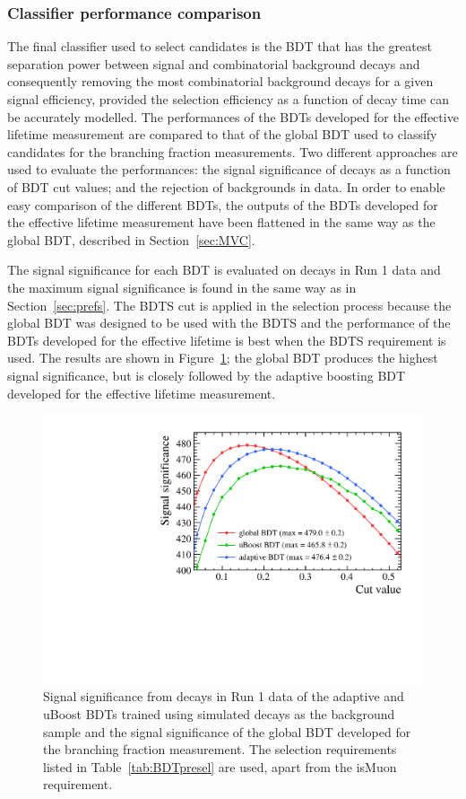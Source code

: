 \subsubsection{Classifier performance comparison}
\label{sec:BDTcomp}
The final classifier used to select \bsmumu candidates is the BDT that has the greatest separation power between signal and combinatorial background decays and consequently removing the most combinatorial background decays for a given signal efficiency, provided the selection efficiency as a function of decay time can be accurately modelled. The performances of the BDTs developed for the effective lifetime measurement are compared to that of the global BDT used to classify candidates for the branching fraction measurements. Two different approaches are used to evaluate the performances: the signal significance of \bhh decays as a function of BDT cut values; and the rejection of \bsmumu backgrounds in data. In order to enable easy comparison of the different BDTs, the outputs of the BDTs developed for the effective lifetime measurement have been flattened in the same way as the global BDT, described in Section~\ref{sec:MVC}. %

The signal significance for each BDT is evaluated on \bhh decays in Run 1 data and the maximum signal significance is found in the same way as in Section~\ref{sec:prefs}. The BDTS cut is applied in the selection process because the global BDT was designed to be used with the BDTS and the performance of the BDTs developed for the effective lifetime is best when the BDTS requirement is used. The results are shown in Figure~\ref{fig:SSall}; the global BDT produces the highest signal significance, but is closely followed by the adaptive boosting BDT developed for the effective lifetime measurement. 

\begin{figure}[tbp]
    \centering
        \includegraphics[width=0.6 \textwidth]{./Figs/Selection/BDT_comp_zoom.pdf}
    \caption{Signal significance from \bhh decays in Run 1 data of the adaptive and uBoost BDTs trained using simulated decays as the background sample and the signal significance of the global BDT developed for the branching fraction measurement. The selection requirements listed in Table~\ref{tab:BDTpresel} are used, apart from the isMuon requirement. }
    \label{fig:SSall}
\end{figure}


